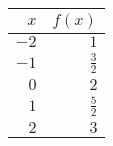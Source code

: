 \begin{tabular}{rr} \toprule
$x$  & $f(x)$        \\\midrule
$-2$ & $1$           \\[6pt]
$-1$ & $\frac{3}{2}$ \\[6pt]
$0$  & $2$           \\[6pt]
$1$  & $\frac{5}{2}$ \\[6pt]
$2$  & $3$           \\\bottomrule
\end{tabular}
